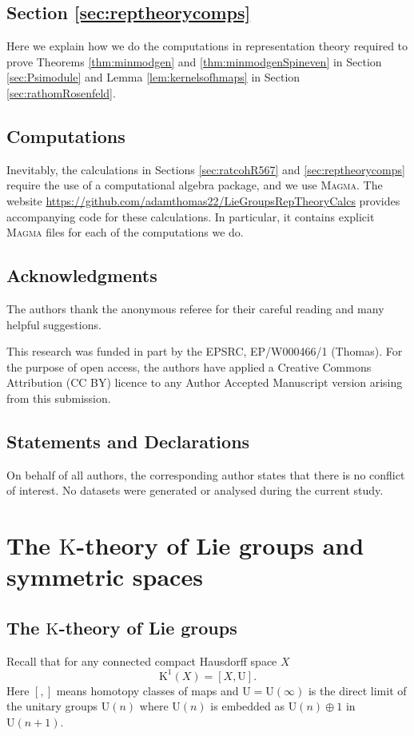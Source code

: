 \documentclass[twoside,a4paper,reqno,11pt]{amsart}
\newcommand{\K}{\mathrm{K}}
\newcommand{\U}{\mathrm{U}}
\newcommand{\Magma}{\textsc{Magma}}
\begin{document}
\subsection*{Section \ref{sec:reptheorycomps}}
Here we explain how we do the computations in representation theory required to prove Theorems \ref{thm:minmodgen} and \ref{thm:minmodgenSpineven} in Section \ref{sec:Psimodule} and Lemma \ref{lem:kernelsofhmaps} in Section \ref{sec:rathomRosenfeld}.

\subsection*{Computations}

Inevitably, the calculations in Sections \ref{sec:ratcohR567} and \ref{sec:reptheorycomps} require the use of a computational algebra package, and we use \Magma{}. The website \url{https://github.com/adamthomas22/LieGroupsRepTheoryCalcs} provides accompanying code for these calculations. In particular, it contains explicit \Magma{} files for each of the computations we do. 

\subsection*{Acknowledgments}
The authors thank the anonymous referee for their careful reading and many helpful suggestions. 

This research was funded in part by the EPSRC, EP/W000466/1 (Thomas). For the purpose of open access, the authors have applied a Creative Commons Attribution (CC BY) licence to any Author Accepted Manuscript version arising from this submission.

\subsection*{Statements and Declarations}

On behalf of all authors, the corresponding author states that there is no conflict of interest. No datasets were generated or analysed during the current study.



\section{The $\K$-theory of Lie groups and symmetric spaces} \label{sec:Ktheorybasics} 

\subsection{The $\K$-theory of Lie groups} 
Recall that for any connected compact Hausdorff space $X$ 
$$
\K^1(X) = [X, \U].
$$
Here $[ , ] $ means homotopy classes of maps and $\U = \U(\infty)$ is the direct limit of the unitary groups $
\U(n)$ where $\U(n)$ is embedded as $\U(n) \oplus 1$ in $\U(n+1)$.  
\end{document}
